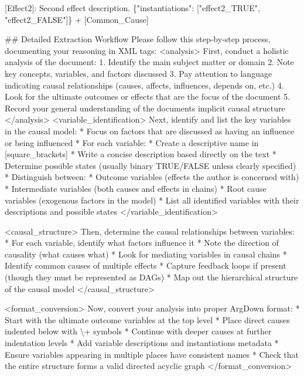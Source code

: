 \documentclass[
  11pt,
  letterpaper,
  openany]{book}
\newenvironment{Shaded}{\begin{snugshade}}{\end{snugshade}}
\newcommand{\ErrorTok}[1]{\textcolor[rgb]{0.68,0.00,0.00}{#1}}
\newcommand{\StringTok}[1]{\textcolor[rgb]{0.13,0.47,0.30}{#1}}
\begin{document}
\begin{landscape}
\begin{Shaded}
\begin{Highlighting}[]
\StringTok{[Effect2]: Second effect description. \{"instantiations": ["effect2\_TRUE", "effect2\_FALSE"]\}}
\StringTok{  + [Common\_Cause]}

\StringTok{\#\# Detailed Extraction Workflow}
\StringTok{Please follow this step{-}by{-}step process, documenting your reasoning in XML tags:}
\StringTok{\textless{}analysis\textgreater{}}
\StringTok{First, conduct a holistic analysis of the document:}
\StringTok{1. Identify the main subject matter or domain}
\StringTok{2. Note key concepts, variables, and factors discussed}
\StringTok{3. Pay attention to language indicating causal relationships (causes, affects, influences, depends on, etc.)}
\StringTok{4. Look for the ultimate outcomes or effects that are the focus of the document}
\StringTok{5. Record your general understanding of the document\textquotesingle{}s implicit causal structure}
\StringTok{\textless{}/analysis\textgreater{}}
\StringTok{\textless{}variable\_identification\textgreater{}}
\StringTok{Next, identify and list the key variables in the causal model:}
\StringTok{* Focus on factors that are discussed as having an influence or being influenced}
\StringTok{* For each variable:}
\StringTok{  * Create a descriptive name in [square\_brackets]}
\StringTok{  * Write a concise description based directly on the text}
\StringTok{  * Determine possible states (usually binary TRUE/FALSE unless clearly specified)}
\StringTok{* Distinguish between:}
\StringTok{  * Outcome variables (effects the author is concerned with)}
\StringTok{  * Intermediate variables (both causes and effects in chains)}
\StringTok{  * Root cause variables (exogenous factors in the model)}
\StringTok{* List all identified variables with their descriptions and possible states}
\StringTok{\textless{}/variable\_identification\textgreater{}}

\StringTok{\textless{}causal\_structure\textgreater{}}
\StringTok{Then, determine the causal relationships between variables:}
\StringTok{* For each variable, identify what factors influence it}
\StringTok{* Note the direction of causality (what causes what)}
\StringTok{* Look for mediating variables in causal chains}
\StringTok{* Identify common causes of multiple effects}
\StringTok{* Capture feedback loops if present (though they must be represented as DAGs)}
\StringTok{* Map out the hierarchical structure of the causal model}
\StringTok{\textless{}/causal\_structure\textgreater{}}

\StringTok{\textless{}format\_conversion\textgreater{}}
\StringTok{Now, convert your analysis into proper ArgDown format:}
\StringTok{* Start with the ultimate outcome variables at the top level}
\StringTok{* Place direct causes indented below with }\ErrorTok{\textbackslash{}}\StringTok{+ symbols}
\StringTok{* Continue with deeper causes at further indentation levels}
\StringTok{* Add variable descriptions and instantiations metadata}
\StringTok{* Ensure variables appearing in multiple places have consistent names}
\StringTok{* Check that the entire structure forms a valid directed acyclic graph}
\StringTok{\textless{}/format\_conversion\textgreater{}}


\end{Highlighting}
\end{Shaded}
\end{landscape}
\end{document}

